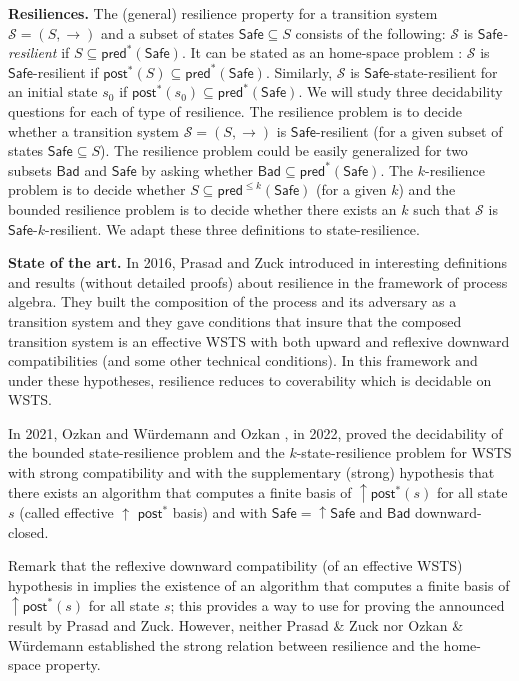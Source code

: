 \documentclass[runningheads]{llncs}
\newcommand{\pred}{\textsf{pred}}
\newcommand{\post}{\textsf{post}}
\newcommand{\Bad}{\textsf{Bad}}
\newcommand{\Safe}{\textsf{Safe}}
\begin{document}
{\bf Resiliences.}  
The (general) resilience property for a transition system $\mathscr{S} = (S,\rightarrow )$ and a subset of states $\Safe \subseteq S$ consists of the following: $\mathscr{S}$ is {\em $\Safe$-resilient} if
$S \subseteq \pred^*(\Safe)$. It 
can be stated as an home-space problem : $\mathscr{S}$ is $\Safe$-resilient if $\post^*(S) \subseteq \pred^*(\Safe)$.
Similarly, $\mathscr{S}$ is $\Safe$-state-resilient for an initial state $s_0$ if  
$\post^*(s_0) \subseteq \pred^*(\Safe)$.
We will study three decidability questions for each of type of resilience.
The resilience problem is to decide whether a transition system $\mathscr{S} = (S,\rightarrow )$ is $\Safe$-resilient (for a given subset of states $\Safe \subseteq S$).
The resilience problem could be easily generalized for two subsets $\Bad$ and $\Safe$ by asking
whether $\Bad \subseteq \pred^*(\Safe)$.
The $k$-resilience problem is to decide whether $S \subseteq \pred^{\leq k}(\Safe)$ (for a given $k$) and 
the bounded resilience problem is to decide whether there exists an $k$ such that $\mathscr{S}$ is $\Safe$-$k$-resilient. We adapt these three definitions to state-resilience.


{\bf State of the art.}
In 2016, Prasad and Zuck introduced in  \cite{DBLP:journals/corr/PrasadZ16} interesting definitions and results (without detailed proofs) about resilience in the framework of process algebra. They built the composition of the process and its adversary as a transition system and they gave conditions that insure that the composed transition system is an effective WSTS with both upward and reflexive downward compatibilities (and some other technical conditions). In this framework and under these hypotheses, resilience reduces to coverability which is decidable on WSTS. 

In 2021, Ozkan and Würdemann  \cite{DBLP:journals/corr/abs-2108-00889} and Ozkan \cite{DBLP:conf/gg/Ozkan22}, in 2022, proved the decidability of the bounded state-resilience problem and the $k$-state-resilience problem for WSTS  with strong compatibility and with the supplementary (strong) hypothesis that there exists an algorithm that computes a finite basis of $\uparrow \post^*(s)$ for all state $s$ (called effective 
$\uparrow$ $\post^*$ basis) and with $\Safe=\uparrow \Safe$ and $\Bad$ downward-closed.


Remark that the reflexive downward compatibility (of an effective WSTS) hypothesis in  \cite{DBLP:journals/corr/PrasadZ16} implies the existence of an algorithm that computes a finite basis of $\uparrow \post^*(s)$ for all state $s$; this provides a way to use \cite{DBLP:journals/corr/abs-2108-00889} for proving the announced result by Prasad and Zuck.
However, neither Prasad \& Zuck nor Ozkan \& Würdemann established the strong relation between resilience and the home-space property.
%
\end{document}
